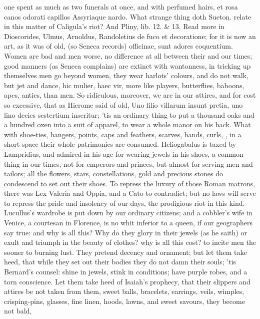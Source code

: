{one spent as much as two funerals at once, and with perfumed hairs,
et rosa canos odorati capillos Assyriaque nardo. What strange
thing doth Sueton. relate in this matter of Caligula's riot? And
Pliny, lib. 12. \& 13. Read more in Dioscorides, Ulmus, Arnoldus,
Randoletius de fuco et decoratione; for it is now an art, as it was of
old, (so Seneca records) officinae, sunt adores coquentium. Women
are bad and men worse, no difference at all between their and our
times; good manners (as Seneca complains) are extinct with
wantonness, in tricking up themselves men go beyond women, they wear
harlots' colours, and do not walk, but jet and dance, hic mulier, haec
vir, more like players, butterflies, baboons, apes, antics, than men.
So ridiculous, moreover, we are in our attires, and for cost so
excessive, that as Hierome said of old, Uno filio villarum insunt
pretia, uno lino decies sestertium inseritur; 'tis an ordinary thing to
put a thousand oaks and a hundred oxen into a suit of apparel, to wear
a whole manor on his back. What with shoe-ties, hangers, points, caps
and feathers, scarves, bands, curls, \etc{}, in a short space their whole
patrimonies are consumed. Heliogabalus is taxed by Lampridius, and
admired in his age for wearing jewels in his shoes, a common thing in
our times, not for emperors and princes, but almost for serving men and
tailors; all the flowers, stars, constellations, gold and precious
stones do condescend to set out their shoes. To repress the luxury of
those Roman matrons, there was Lex Valeria and Oppia, and a Cato
to contradict; but no laws will serve to repress the pride and
insolency of our days, the prodigious riot in this kind. Lucullus's
wardrobe is put down by our ordinary citizens; and a cobbler's wife in
Venice, a courtesan in Florence, is no whit inferior to a queen, if our
geographers say true: and why is all this? Why do they glory in their
jewels (as he saith) or exult and triumph in the beauty of
clothes? why is all this cost? to incite men the sooner to burning
lust. They pretend decency and ornament; but let them take heed, that
while they set out their bodies they do not damn their souls; 'tis
Bernard's counsel: shine in jewels, stink in conditions; have
purple robes, and a torn conscience. Let them take heed of Isaiah's
prophecy, that their slippers and attires be not taken from them, sweet
balls, bracelets, earrings, veils, wimples, crisping-pins, glasses,
fine linen, hoods, lawns, and sweet savours, they become not bald,
}
